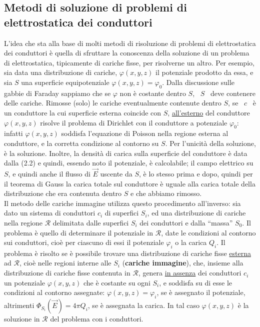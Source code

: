 \subsection{Metodi di soluzione di problemi di elettrostatica dei conduttori}

L'idea che sta alla base di molti metodi di risoluzione di problemi di
elettrostatica dei conduttori \`e quella di sfruttare la conoscenza della
soluzione di un problema di elettrostatica, tipicamente di cariche fisse, per
risolverne un altro. Per esempio, sia data una distribuzione di cariche,
$\varphi(x,y,z)$ il potenziale prodotto da essa, e sia $S$ una superficie
equipotenziale $\varphi(x,y,z)=\varphi_0$. Dalla discussione sulle gabbie di
Faraday sappiamo che se $\varphi$ non \`e costante dentro $S$, \ $S$ \ deve
contenere delle cariche. Rimosse (solo) le cariche eventualmente contenute
dentro $S$, se \ $c$ \ \`e un conduttore la cui superficie esterna coincide con
$S$, \underline{all'esterno} del conduttore $\varphi(x,y,z)$ risolve il problema
di Dirichlet con il conduttore a potenziale $\varphi_0$: infatti
$\varphi(x,y,z)$ soddisfa l'equazione di Poisson nella regione esterna al
conduttore, e la corretta condizione al contorno su $S$. Per l'unicit\`a della
soluzione, \`e la soluzione. Inoltre, la densit\`a di carica sulla superficie
del conduttore \`e data dalla (2.2) e quindi, essendo noto il potenziale, \`e
calcolabile; il campo elettrico su $S$, e quindi anche il flusso di $\vec E$
uscente da $S$, \`e lo stesso prima e dopo, quindi per il teorema di Gauss la
carica totale sul conduttore \`e uguale alla carica totale della distribuzione
che era contenuta dentro $S$ e che abbiamo rimosso.\\
Il metodo delle cariche immagine utilizza questo procedimento all'inverso: sia
dato un sistema di conduttori $c_i$ di superfici $S_i$, ed una distribuzione di
cariche nella regione $\mathcal R$ delimitata dalle superfici $S_i$ dei
conduttori e dalla ``massa'' $S_0$. Il problema \`e quello di determinare il
potenziale in $\mathcal R$, date le condizioni al contorno sui conduttori,
cio\`e per ciascuno di essi il potenziale $\varphi_i$ o la carica $Q_i$. Il
problema \`e risolto se \`e possibile trovare una distribuzione di cariche fisse
\underline{esterna} ad $\mathcal R$, cio\`e nelle regioni interne alle $S_i$
(\textbf{cariche immagine}), che, insieme alla distribuzione di cariche fisse
contenuta in $\mathcal R$, genera \underline{in assenza} dei conduttori $c_i$ un
potenziale $\varphi(x,y,z)$ che \`e costante su ogni $S_i$, e soddisfa su di
esse le condizioni al contorno assegnate: $\varphi(x,y,z)=\varphi_i$, se \`e
assegnato il potenziale, altrimenti $\Phi_{S_i}(\vec E)=4\pi Q_i$, se \`e
assegnata la carica. In tal caso $\varphi(x,y,z)$ \`e la soluzione in
$\mathcal R$ del problema con i conduttori.

